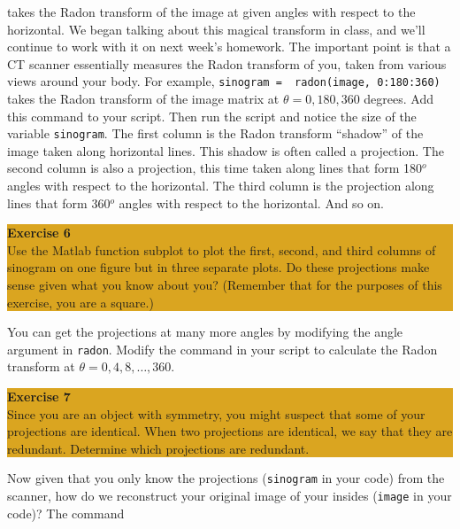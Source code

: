 \documentclass[12pt]{amsart}
\begin{document}
\noindent takes the Radon transform of the image at given angles with respect to the horizontal.  We began talking about this magical transform in class, and we'll continue to work with it on next week's homework.   The important point is that a CT scanner essentially measures the Radon transform of you, taken from various views around your body.  For example, \verb+sinogram =  radon(image, 0:180:360)+ takes the Radon transform of the image matrix at $\theta = 0, 180, 360$ degrees.  Add this command to your script.  Then run the script and notice the size of the variable \verb+sinogram+.  The first column is the Radon transform ``shadow'' of the image taken along horizontal lines.  This shadow is often called a projection.  The second column is also a projection, this time taken along lines that form 180$^o$ angles with respect to the horizontal.  The third column is the projection along lines that form 360$^o$ angles with respect to the horizontal.  And so on.
\bigskip
\begin{center}
\colorbox{Goldenrod}{\parbox{15cm}{
{
\textbf{\large Exercise 6}\vspace{1mm} \\
Use the Matlab function subplot to plot the first, second, and third columns of sinogram on one figure but in three separate plots.    Do these projections make sense given what you know about you?  (Remember that for the purposes of this exercise, you are a square.)\\ 
 }}}
\end{center}


\bigskip
\noindent You can get the projections at many more angles by modifying the angle argument in \verb+radon+.  Modify the command in your script  to calculate the Radon transform at $\theta = 0, 4, 8, \ldots, 360$.  

\bigskip
\begin{center}
\colorbox{Goldenrod}{\parbox{15cm}{
{
\textbf{\large Exercise 7}\vspace{1mm} 
\\ 
Since you are an object with symmetry, you might suspect that some of your projections are identical.  When two projections are identical, we say that they are redundant.  Determine which projections are redundant.  }}}
\end{center}

\bigskip

\noindent Now given that you only know the projections (\verb+sinogram+ in your code) from the scanner, how do we reconstruct your original image of your insides (\verb+image+ in your code)?  The command \\
\end{document}
